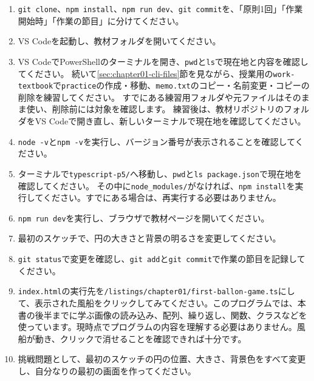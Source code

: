 \begin{enumerate}
    \item \texttt{git clone}、\texttt{npm install}、\texttt{npm run dev}、\texttt{git commit}を、「原則1回」「作業開始時」「作業の節目」に分けてください。
    \item VS Codeを起動し、教材フォルダを開いてください。
    \item VS CodeでPowerShellのターミナルを開き、\texttt{pwd}と\texttt{ls}で現在地と内容を確認してください。
    続いて\ref{sec:chapter01-cli-files}節を見ながら、授業用の\texttt{work-textbook}で\texttt{practice}の作成・移動、\texttt{memo.txt}のコピー・名前変更・コピーの削除を練習してください。
    すでにある練習用フォルダや元ファイルはそのまま使い、削除前には対象を確認します。
    練習後は、教材リポジトリのフォルダをVS Codeで開き直し、新しいターミナルで現在地を確認してください。
    \item \texttt{node -v}と\texttt{npm -v}を実行し、バージョン番号が表示されることを確認してください。
    \item ターミナルで\texttt{typescript-p5/}へ移動し、\texttt{pwd}と\texttt{ls package.json}で現在地を確認してください。
    その中に\texttt{node\_modules/}がなければ、\texttt{npm install}を実行してください。すでにある場合は、再実行する必要はありません。
    \item \texttt{npm run dev}を実行し、ブラウザで教材ページを開いてください。
    \item 最初のスケッチで、円の大きさと背景の明るさを変更してください。
    \item \texttt{git status}で変更を確認し、\texttt{git add}と\texttt{git commit}で作業の節目を記録してください。
    \item \texttt{index.html}の実行先を\texttt{/listings/chapter01/first-ballon-game.ts}にして、表示された風船をクリックしてみてください。このプログラムでは、本書の後半までに学ぶ画像の読み込み、配列、繰り返し、関数、クラスなどを使っています。現時点でプログラムの内容を理解する必要はありません。風船が動き、クリックで消せることを確認できれば十分です。
    \item 挑戦問題として、最初のスケッチの円の位置、大きさ、背景色をすべて変更し、自分なりの最初の画面を作ってください。
\end{enumerate}
